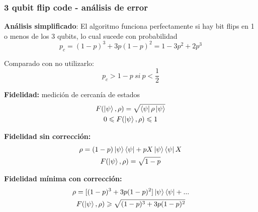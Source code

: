 \documentclass[10pt]{beamer}
\theoremstyle{remark}
\theoremstyle{definition}
\begin{document}
\begin{frame}[allowframebreaks]
    \frametitle{3 qubit flip code - análisis de error}

    \textbf{Análisis simplificado}: El algoritmo funciona perfectamente si hay bit flips en 1 o menos de los 3 qubits, lo cual sucede con probabilidad
    \[
        p_c = (1 - p)^3 + 3p(1 - p)^2 = 1 - 3p^2 + 2p^3
    \]

    Comparado con no utilizarlo:
    \[
        p_c > 1 - p \ si \ p < \frac{1}{2}
    \]

    \framebreak

    \textbf{Fidelidad:} medición de cercanía de estados
    \begin{gather*}
        F(\ket{\psi}, \rho) = \sqrt{\bra{\psi} \rho \ket{\psi}} \\
        0 \leqslant F(\ket{\psi}, \rho) \leqslant 1
    \end{gather*}

    \textbf{Fidelidad sin corrección:}
    \begin{gather*}
        \rho = (1 - p) \ket{\psi}\bra{\psi} + p X \ket{\psi}\bra{\psi} X \\
        F(\ket{\psi}, \rho) = \sqrt{1 - p}
    \end{gather*}
    
    \textbf{Fidelidad mínima con corrección:}
    \begin{gather*}
        \rho = [(1 - p)^3 + 3p(1 - p)^2] \ket{\psi}\bra{\psi} + ... \\
        F(\ket{\psi}, \rho) \geqslant \sqrt{(1 - p)^3 + 3p(1 - p)^2}
    \end{gather*}

\end{frame}
\end{document}
